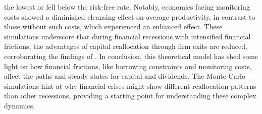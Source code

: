 \documentclass[12pt]{report}
\begin{document}
the lowest or fell below the risk-free rate. Notably, economies facing monitoring costs showed a diminished cleansing
effect on average productivity, in contrast to those without such costs, which experienced an enhanced effect. These
simulations underscore that during financial recessions with intensified financial frictions, the advantages of capital
reallocation through firm exits are reduced, corroborating the findings of \cite{OsePap17}. 
In conclusion, this theoretical model has shed some light on how financial frictions, like borrowing constraints and
monitoring costs, affect the paths and steady states for capital and dividends. The Monte Carlo simulations hint at why
financial crises might show different reallocation patterns than other recessions, providing a starting point for
understanding these complex dynamics.  
\medskip

\end{document}
